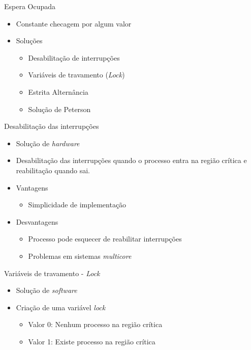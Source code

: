 \documentclass[aspectratio=169,
				xcolor=table]{beamer}
\begin{document}
	\begin{frame} {Espera Ocupada}
		\begin{itemize}
			\item Constante checagem por algum valor
			\vspace{1em}
			\item Soluções
			\begin{itemize}
				\item Desabilitação de interrupções
				\item Variáveis de travamento (\textit{Lock})
				\item Estrita Alternância
				\item Solução de Peterson
			\end{itemize}
		\end{itemize}
	\end{frame}	
	
	\begin{frame}{Desabilitação das interrupções}
		\begin{itemize}
			\item Solução de \textit{hardware}
			\vspace{1em}
			\item Desabilitação das interrupções quando o processo entra na região crítica e reabilitação quando sai.
			\vspace{1em}
			\item Vantagens
			\begin{itemize}
				\item Simplicidade de implementação
			\end{itemize}
			\vspace{1em}
			\item Desvantagens
			\begin{itemize}
				\item Processo pode esquecer de reabilitar interrupções
				\item Problemas em sistemas \textit{multicore}
			\end{itemize}
		\end{itemize}
	\end{frame}
	
	\begin{frame}{Variáveis de travamento - \textit{Lock}}
		\begin{itemize}
			\item Solução de \textit{software}
			\vspace{1em}
			\item Criação de uma variável \textit{lock}
			\begin{itemize}
				\item Valor 0: Nenhum processo na região crítica
				\item Valor 1: Existe processo na região crítica
			\end{itemize}
		\end{itemize}		
	\end{frame}
	
\end{document}

